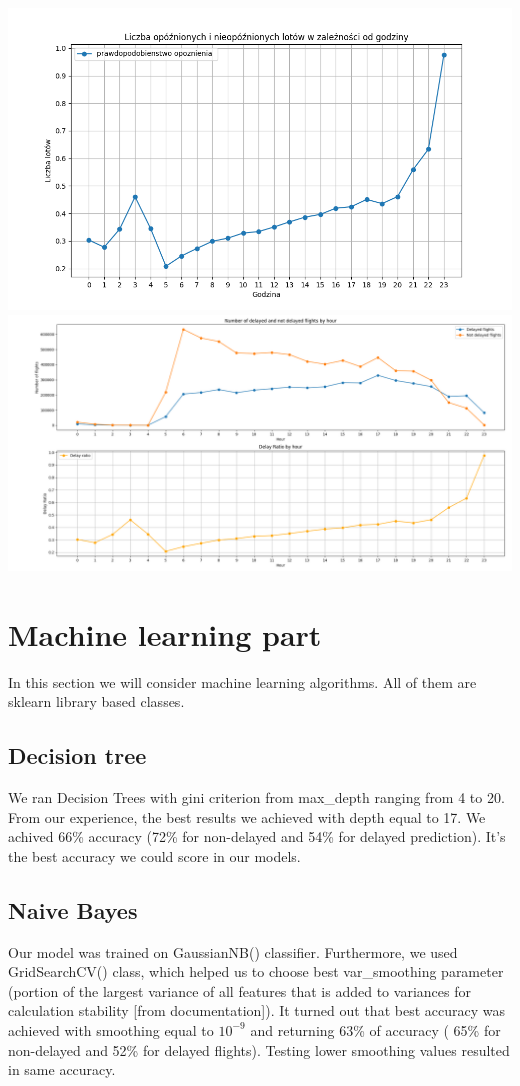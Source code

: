 \documentclass{article}
\begin{document}
	\includegraphics[scale=0.4]{delay_plot}
	\includegraphics[scale=0.25]{delay_plot2}

\newpage

\section{Machine learning part}
In this section we will consider machine learning algorithms. All of them are sklearn library based classes.
\subsection{Decision tree}
We ran Decision Trees with gini criterion from max\_depth ranging from 4 to 20.
From our experience, the best results we achieved with depth equal to 17. We achived 66\% accuracy (72\% for non-delayed and 54\% for delayed prediction). It's the best accuracy we could score in our
models.

\subsection{Naive Bayes}
Our model was trained on GaussianNB() classifier. Furthermore, we used GridSearchCV() class, which helped us
to choose best var\_smoothing parameter (portion of the largest variance of all features that is added to variances for calculation stability [from
documentation]). It turned out that best accuracy was achieved with smoothing equal to $10^{-9}$ and returning 63\% of accuracy ( 65\% for non-delayed and 52\% for delayed flights). Testing lower 
smoothing values resulted in same accuracy.
\end{document}
